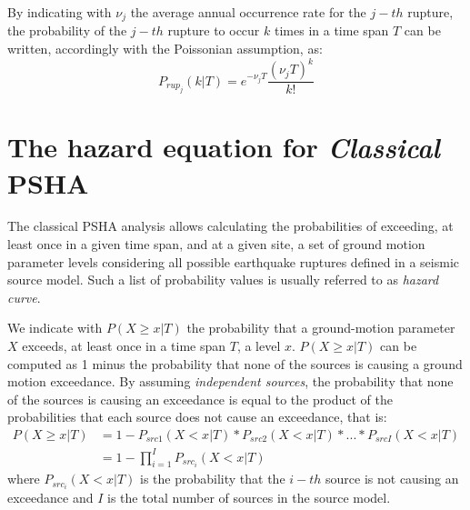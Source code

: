 By indicating with $\nu_{j}$ the average annual occurrence rate for the $j-th$ rupture, the probability of the
$j-th$ rupture to occur $k$ times in a time span $T$ can be written, accordingly with the Poissonian assumption,
as:
\begin{equation}
\label{eq:poisson_pd}
P_{rup_{j}}(k | T) = e^{-\nu_{j} T} \frac{(\nu_{j} T) ^ {k}}{k!}
\end{equation}

\section{The hazard equation for \textit{Classical} PSHA}
The classical PSHA analysis allows calculating the probabilities of exceeding, at least once in a given time
span, and at a given site, a set of ground motion parameter levels considering all possible earthquake ruptures
defined in a seismic source model. Such a list of probability values is usually referred to as \textit{hazard curve}.

We indicate with $P(X \ge x | T)$ the probability that a ground-motion parameter $X$ exceeds, at least once in
a time span $T$, a level $x$. $P(X \ge x | T)$ can be computed as 1 minus the probability that none of the
sources is causing a ground motion exceedance. By assuming \textit{independent sources}, the probability
that none of the sources is causing an exceedance is equal to the product of the probabilities that each source
does not cause an exceedance, that is:
\begin{align}
\label{eq:hazard_eq}
P(X \ge x | T) & =  1 - P_{src1}(X < x | T) * P_{src2}(X < x | T) * ... * P_{srcI}(X < x | T) \nonumber \\
		      & =  1 - \prod_{i=1}^{I} P_{src_{i}}(X < x | T)
\end{align}
where $P_{src_{i}}(X < x | T)$ is the probability that the $i-th$ source is not causing an exceedance and $I$ is the
total number of sources in the source model.


